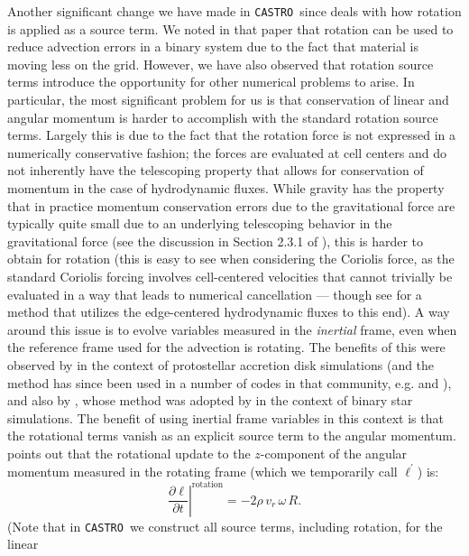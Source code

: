 \documentclass[twocolumn,numberedappendix]{../aastex60}
\newcommand{\castro}{\texttt{CASTRO}}
\begin{document}
Another significant change we have made in \castro\ since \citet{wdmergerI} deals
with how rotation is applied as a source term. We noted in that paper that rotation
can be used to reduce advection errors in a binary system due to the fact that
material is moving less on the grid. However, we have also observed that rotation
source terms introduce the opportunity for other numerical problems to arise. In
particular, the most significant problem for us is that conservation of linear and
angular momentum is harder to accomplish with the standard rotation source terms.
Largely this is due to the fact that the rotation force is not expressed in a numerically
conservative fashion; the forces are evaluated at cell centers and do not inherently
have the telescoping property that allows for conservation of momentum in the case
of hydrodynamic fluxes. While gravity has the property that in practice momentum
conservation errors due to the gravitational force are typically quite small due to
an underlying telescoping behavior in the gravitational force (see the discussion
in Section 2.3.1 of \cite{wdmergerI}), this is harder to obtain for rotation (this is
easy to see when considering the Coriolis force, as the standard Coriolis forcing
involves cell-centered velocities that cannot trivially be evaluated in a way that
leads to numerical cancellation --- though see \citet{audusse:2009} for a method that
utilizes the edge-centered hydrodynamic fluxes to this end). A way around this issue
is to evolve variables measured in the \textit{inertial} frame, even when the reference
frame used for the advection is rotating. The benefits of this were observed by
\citet{kley:1998} in the context of protostellar accretion disk simulations (and the
method has since been used in a number of codes in that community, e.g. \citet{NIRVANA}
and \citet{FARGO3D}), and also by \citet{call:2010}, whose method was adopted by
\citet{byerly:2014} in the context of binary star simulations. The benefit of using
inertial frame variables in this context is that the rotational terms vanish as an explicit
source term to the angular momentum. \citet{kley:1998} points out that the rotational update
to the $z$-component of the angular momentum measured in the rotating frame (which we
temporarily call $\ell^\prime$) is:
\begin{equation}
  \left.\frac{\partial \ell}{\partial t}\right|^{\text{rotation}} = -2\rho\, v_r\, \omega\, R.\label{eq:rotating-angular-momentum}
\end{equation}
(Note that in \castro\ we construct all source terms, including rotation, for the linear
\end{document}
